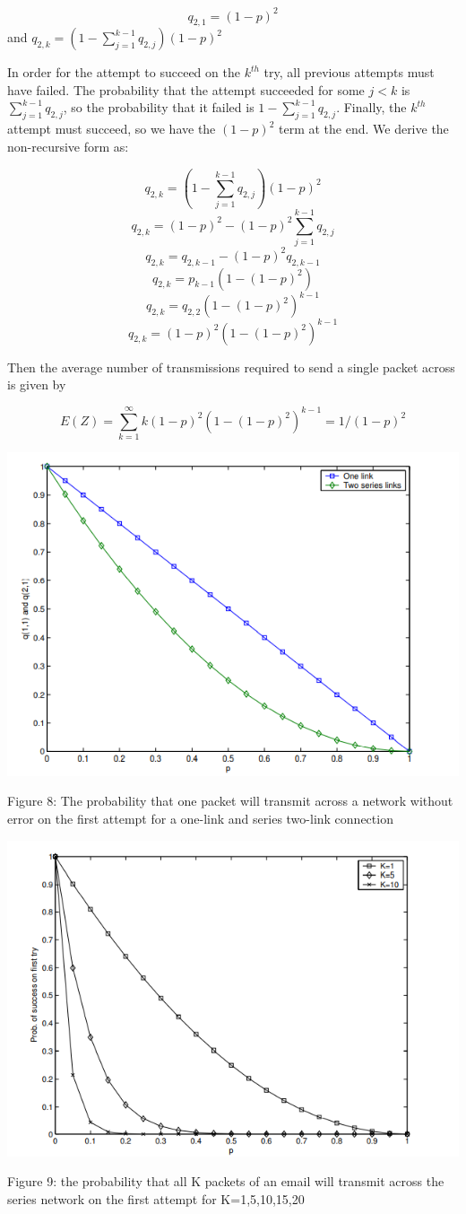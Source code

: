 \documentclass[10pt,twocolumn,letterpaper]{article}
\begin{document}
$$ q_{2,1} = (1-p)^2 $$
and $ q_{2,k} = (1-\sum_{j=1}^{k-1} q_{2,j})(1-p)^2 $

In order for the attempt to succeed on the $k^{th}$ try, all previous attempts must have failed. The probability that the attempt succeeded for some $j<k$ is $\sum_{j=1}^{k-1} q_{2,j}$, so the probability that it failed is $1- \sum_{j=1}^{k-1} q_{2,j}$. Finally, the $k^{th}$ attempt must succeed, so we have the $(1-p)^2$ term at the end. We derive the non-recursive form as:

$$ q_{2,k} = (1-\sum_{j=1}^{k-1} q_{2,j})(1-p)^2 $$
$$ q_{2,k} = (1-p)^2 - (1-p)^2 \sum_{j=1}^{k-1} q_{2,j} $$
$$ q_{2,k} = q_{2,k-1} - (1-p)^2 q_{2,k-1} $$
$$ q_{2,k} = p_{k-1} (1-(1-p)^2) $$
$$ q_{2,k} = q_{2,2} (1-(1-p)^2)^{k-1} $$
$$ q_{2,k} = (1-p)^2 (1-(1-p)^2)^{k-1} $$

Then the average number of transmissions required to send a single packet across is given by 

$$ E(Z) = \sum_{k=1}^{\infty} k(1-p)^2 (1-(1-p)^2)^{k-1} = 1/(1-p)^2 $$

\includegraphics[width=\linewidth]{plots/fig8.PNG}
\caption{Figure 8: The probability that one packet will transmit across a network without error on the first attempt for a one-link and series two-link connection}

\includegraphics[width=\linewidth]{plots/fig9.PNG}
\caption{Figure 9: the probability that all K packets of an email will transmit across the series network on the first attempt for K=1,5,10,15,20}
\end{document}

